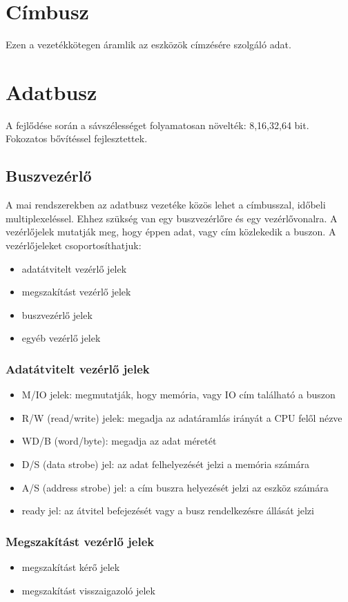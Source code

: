 \section{Címbusz}
Ezen a vezetékkötegen áramlik az eszközök címzésére szolgáló adat.

\section{Adatbusz}
A fejlődése során a sávszélességet folyamatosan növelték: 8,16,32,64 bit.
Fokozatos bővítéssel fejlesztettek.

\subsection{Buszvezérlő}
A mai rendszerekben az adatbusz vezetéke közös lehet a címbusszal, időbeli multiplexeléssel.
Ehhez szükség van egy buszvezérlőre és egy vezérlővonalra.
A vezérlőjelek mutatják meg, hogy éppen adat, vagy cím közlekedik a buszon.
A vezérlőjeleket csoportosíthatjuk:
\begin{itemize}
    \item adatátvitelt vezérlő jelek
    \item megszakítást vezérlő jelek
    \item buszvezérlő jelek
    \item egyéb vezérlő jelek
\end{itemize}

\subsubsection{Adatátvitelt vezérlő jelek}
\begin{itemize}
    \item M/IO jelek: megmutatják, hogy memória, vagy IO cím található a buszon
    \item R/W (read/write) jelek: megadja az adatáramlás irányát a CPU felől nézve
    \item WD/B (word/byte): megadja az adat méretét
    \item D/S (data strobe) jel: az adat felhelyezését jelzi a memória számára
    \item A/S (address strobe) jel: a cím buszra helyezését jelzi az eszköz számára
    \item ready jel: az átvitel befejezését vagy a busz rendelkezésre állását jelzi
\end{itemize}

\subsubsection{Megszakítást vezérlő jelek}
\begin{itemize}
    \item megszakítást kérő jelek
    \item megszakítást visszaigazoló jelek
\end{itemize}

